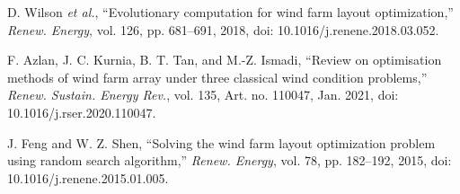 D. Wilson \textit{et al.}, ``Evolutionary computation for wind farm layout optimization,'' \textit{Renew. Energy}, vol. 126, pp. 681--691, 2018, doi: 10.1016/j.renene.2018.03.052.

F. Azlan, J. C. Kurnia, B. T. Tan, and M.-Z. Ismadi, ``Review on optimisation methods of wind farm array under three classical wind condition problems,'' \textit{Renew. Sustain. Energy Rev.}, vol. 135, Art. no. 110047, Jan. 2021, doi: 10.1016/j.rser.2020.110047.

J. Feng and W. Z. Shen, ``Solving the wind farm layout optimization problem using random search algorithm,'' \textit{Renew. Energy}, vol. 78, pp. 182--192, 2015, doi: 10.1016/j.renene.2015.01.005.
